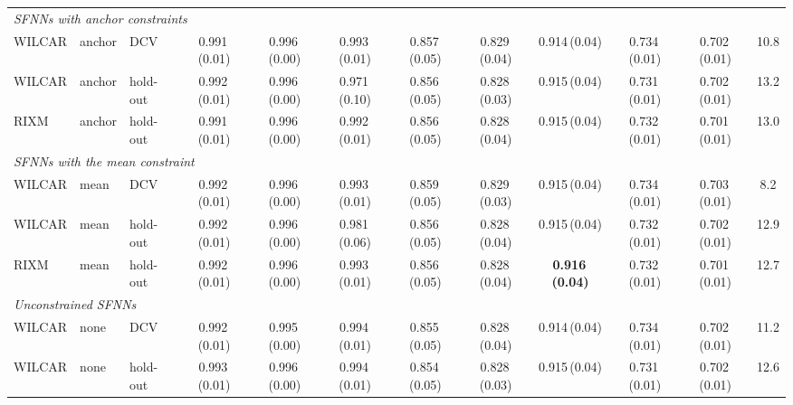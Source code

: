 \begin{table}[!tbp]
{\begin{tabular}{lllccccccccc}
\midrule
\multicolumn{12}{l}{\textit{SFNNs with anchor constraints}} \\
WILCAR & anchor & DCV & 0.991\,{\scriptsize(0.01)} & 0.996\,{\scriptsize(0.00)} & 0.993\,{\scriptsize(0.01)} & 0.857\,{\scriptsize(0.05)} & 0.829\,{\scriptsize(0.04)} & 0.914\,{\scriptsize(0.04)} & 0.734\,{\scriptsize(0.01)} & 0.702\,{\scriptsize(0.01)} & 10.8 \\
WILCAR & anchor & hold-out & 0.992\,{\scriptsize(0.01)} & 0.996\,{\scriptsize(0.00)} & 0.971\,{\scriptsize(0.10)} & 0.856\,{\scriptsize(0.05)} & 0.828\,{\scriptsize(0.03)} & 0.915\,{\scriptsize(0.04)} & 0.731\,{\scriptsize(0.01)} & 0.702\,{\scriptsize(0.01)} & 13.2 \\
RIXM & anchor & hold-out & 0.991\,{\scriptsize(0.01)} & 0.996\,{\scriptsize(0.00)} & 0.992\,{\scriptsize(0.01)} & 0.856\,{\scriptsize(0.05)} & 0.828\,{\scriptsize(0.04)} & 0.915\,{\scriptsize(0.04)} & 0.732\,{\scriptsize(0.01)} & 0.701\,{\scriptsize(0.01)} & 13.0 \\
\midrule
\multicolumn{12}{l}{\textit{SFNNs with the mean constraint}} \\
WILCAR & mean & DCV & 0.992\,{\scriptsize(0.01)} & 0.996\,{\scriptsize(0.00)} & 0.993\,{\scriptsize(0.01)} & 0.859\,{\scriptsize(0.05)} & 0.829\,{\scriptsize(0.03)} & 0.915\,{\scriptsize(0.04)} & 0.734\,{\scriptsize(0.01)} & 0.703\,{\scriptsize(0.01)} & 8.2 \\
WILCAR & mean & hold-out & 0.992\,{\scriptsize(0.01)} & 0.996\,{\scriptsize(0.00)} & 0.981\,{\scriptsize(0.06)} & 0.856\,{\scriptsize(0.05)} & 0.828\,{\scriptsize(0.04)} & 0.915\,{\scriptsize(0.04)} & 0.732\,{\scriptsize(0.01)} & 0.702\,{\scriptsize(0.01)} & 12.9 \\
RIXM & mean & hold-out & 0.992\,{\scriptsize(0.01)} & 0.996\,{\scriptsize(0.00)} & 0.993\,{\scriptsize(0.01)} & 0.856\,{\scriptsize(0.05)} & 0.828\,{\scriptsize(0.04)} & \textbf{0.916\,{\scriptsize(0.04)}} & 0.732\,{\scriptsize(0.01)} & 0.701\,{\scriptsize(0.01)} & 12.7 \\
\midrule
\multicolumn{12}{l}{\textit{Unconstrained SFNNs}} \\
WILCAR & none & DCV & 0.992\,{\scriptsize(0.01)} & 0.995\,{\scriptsize(0.00)} & 0.994\,{\scriptsize(0.01)} & 0.855\,{\scriptsize(0.05)} & 0.828\,{\scriptsize(0.04)} & 0.914\,{\scriptsize(0.04)} & 0.734\,{\scriptsize(0.01)} & 0.702\,{\scriptsize(0.01)} & 11.2 \\
WILCAR & none & hold-out & 0.993\,{\scriptsize(0.01)} & 0.996\,{\scriptsize(0.00)} & 0.994\,{\scriptsize(0.01)} & 0.854\,{\scriptsize(0.05)} & 0.828\,{\scriptsize(0.03)} & 0.915\,{\scriptsize(0.04)} & 0.731\,{\scriptsize(0.01)} & 0.702\,{\scriptsize(0.01)} & 12.6 \\

\end{tabular}}
\end{table}
